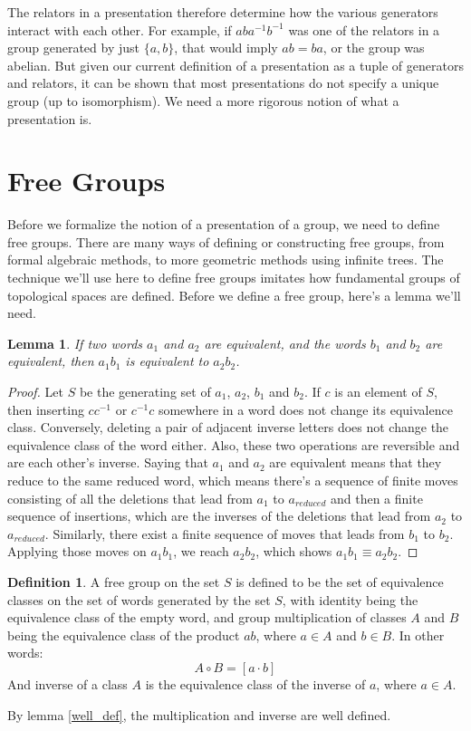 \documentclass[12pt]{article}
\newtheorem{lem}[thm]{Lemma}
\theoremstyle{definition}
\newtheorem{defn}{Definition}[section]
\begin{document}
The relators in a presentation therefore determine how the various generators interact with each other. For example, if $aba^{-1}b^{-1}$ was one of the relators in a group generated by just $\{a,b\}$, that would imply $ab=ba$, or the group was abelian. But given our current definition of a presentation as a tuple of generators and relators, it can be shown that most presentations do not specify a unique group (up to isomorphism). We need a more rigorous notion of what a presentation is.

\section{Free Groups}\label{freegroups}
Before we formalize the notion of a presentation of a group, we need to define free groups. There are many ways of defining or constructing free groups, from formal algebraic methods, to more geometric methods using infinite trees\cite{meier}. The technique we'll use here to define free groups imitates how fundamental groups of topological spaces are defined. Before we define a free group, here's a lemma we'll need.

\begin{lem}\label{well_def}
If two words $a_1$ and $a_2$ are equivalent, and the words $b_1$ and $b_2$ are equivalent, then $a_1b_1$ is equivalent to $a_2b_2$.
\end{lem}

\begin{proof}
Let $S$ be the generating set of $a_1$, $a_2$, $b_1$ and $b_2$. If $c$ is an element of $S$, then inserting $cc^{-1}$ or $c^{-1}c$ somewhere in a word does not change its equivalence class. Conversely, deleting a pair of adjacent inverse letters does not change the equivalence class of the word either. Also, these two operations are reversible and are each other's inverse. Saying that $a_1$ and $a_2$ are equivalent means that they reduce to the same reduced word, which means there's a sequence of finite moves consisting of all the deletions that lead from $a_1$ to $a_{reduced}$ and then a finite sequence of insertions, which are the inverses of the deletions that lead from $a_2$ to $a_{reduced}$. Similarly, there exist a finite sequence of moves that leads from $b_1$ to $b_2$. Applying those moves on $a_1b_1$, we reach $a_2b_2$, which shows $a_1b_1 \equiv a_2b_2$.
\end{proof}

\begin{defn}
A free group on the set $S$ is defined to be the set of equivalence classes on the set of words generated by the set $S$, with identity being the equivalence class of the empty word, and group multiplication of classes $A$ and $B$ being the equivalence class of the product $ab$, where $a \in A$ and $b \in B$. In other words:
$$A \circ B = [a \cdot b]$$
And inverse of a class $A$ is the equivalence class of the inverse of $a$, where $a \in A$.
\end{defn}
By lemma \autoref{well_def}, the multiplication and inverse are well defined.
\end{document}

